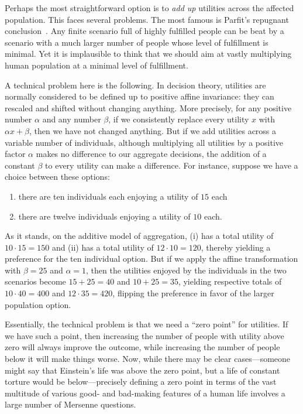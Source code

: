 Perhaps the most straightforward option is to \textit{add up} utilities across the affected population. This faces
several problems. The most famous is Parfit's repugnant conclusion~\parencite[p.~388]{ParfitRP}. Any finite scenario full of highly
fulfilled people can be beat by a scenario with a much larger number of people whose level of fulfillment is
minimal. Yet it is implausible to think that we should aim at vastly multiplying human population at a 
minimal level of fulfillment. 

A technical problem here is the following. In decision theory, utilities are normally considered to be defined 
up to positive affine invariance: they can rescaled and shifted without changing anything. More
precisely, for any positive 
number $\alpha$ and any number $\beta$, if we consistently replace every utility $x$ with $\alpha x + \beta$, then 
we have not changed anything. But if we add utilities across a variable number of individuals, although multiplying all
utilities by a positive factor $\alpha$ makes no difference to our aggregate decisions, the addition of 
a constant $\beta$ to every utility can make a difference. For instance, suppose we have a choice between these
options:
\begin{enumerate}
\item[(i)] there are ten individuals
each enjoying a utility of $15$ each
\item[(ii)] there are twelve individuals enjoying a utility of $10$ each. 
\end{enumerate}
As it stands, on
the additive model of aggregation, (i) has a total utility of $10\cdot 15 = 150$ and (ii) has a total utility of $12\cdot 10 = 120$, thereby yielding a preference for the ten individual
option. But if we apply the affine transformation with $\beta = 25$ and $\alpha=1$, then the utilities enjoyed 
by the individuals in the two scenarios become $15+25=40$ and $10+25=35$, yielding respective totals of $10\cdot 40=400$ and 
$12\cdot 35=420$, flipping the preference in favor of the larger population option. 

Essentially, the technical problem is that we need a ``zero point'' for utilities. If we have such a point, then increasing
the number of people with utility above zero will always improve the outcome, while increasing the number of people below it
will make things worse. Now, while there may be clear cases---someone might say that Einstein's life was above the zero 
point, but a life of constant torture would be below---precisely defining a zero point in terms of the vast multitude of various good- and bad-making features of 
a human life involves a large number of Mersenne questions.

